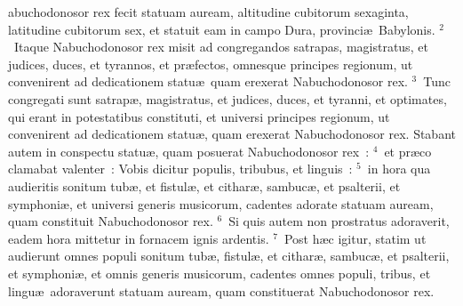 \bchapter
{}abuchodonosor rex fecit statuam auream, altitudine cubitorum sexaginta, latitudine cubitorum sex, et statuit eam in campo Dura, provinci\ae\ Babylonis.
${}^{2}$~Itaque Nabuchodonosor rex misit ad congregandos satrapas, magistratus, et judices, duces, et tyrannos, et pr\ae fectos, omnesque principes regionum, ut convenirent ad dedicationem statu\ae\ quam erexerat Nabuchodonosor rex.
${}^{3}$~Tunc congregati sunt satrap\ae , magistratus, et judices, duces, et tyranni, et optimates, qui erant in potestatibus constituti, et universi principes regionum, ut convenirent ad dedicationem statu\ae , quam erexerat Nabuchodonosor rex. Stabant autem in conspectu statu\ae , quam posuerat Nabuchodonosor rex~:
${}^{4}$~et pr\ae co clamabat valenter~: Vobis dicitur populis, tribubus, et linguis~:
${}^{5}$~in hora qua audieritis sonitum tub\ae , et fistul\ae , et cithar\ae , sambuc\ae , et psalterii, et symphoni\ae , et universi generis musicorum, cadentes adorate statuam auream, quam constituit Nabuchodonosor rex.
${}^{6}$~Si quis autem non prostratus adoraverit, eadem hora mittetur in fornacem ignis ardentis.
${}^{7}$~Post h\ae c igitur, statim ut audierunt omnes populi sonitum tub\ae , fistul\ae , et cithar\ae , sambuc\ae , et psalterii, et symphoni\ae , et omnis generis musicorum, cadentes omnes populi, tribus, et lingu\ae\ adoraverunt statuam auream, quam constituerat Nabuchodonosor rex.



